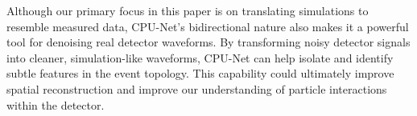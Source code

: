 Although our primary focus in this paper is on translating simulations to resemble measured data, CPU-Net’s bidirectional nature also makes it a powerful tool for denoising real detector waveforms. By transforming noisy detector signals into cleaner, simulation-like waveforms, CPU-Net can help isolate and identify subtle features in the event topology. This capability could ultimately improve spatial reconstruction and improve our understanding of particle interactions within the detector.
